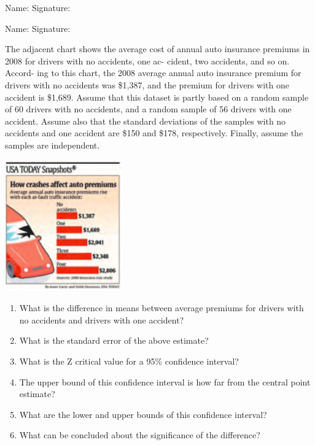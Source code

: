 \documentclass[11pt, chapterprefix=true]{scrbook}\usepackage[]{graphicx}\usepackage[]{color}
\begin{document}
\begin{exercises}
\begin{exercise}
\begin{center}
{{\vspace{4mm}
Name: \underline{\phantom{xxxxxxxxxxxxxxxxxxxxxxxx}} Signature: \underline{\phantom{xxxxxxxxxxxxxxxxxxxxxxxx}}

\vspace{4mm}
Name: \underline{\phantom{xxxxxxxxxxxxxxxxxxxxxxxx}} Signature: \underline{\phantom{xxxxxxxxxxxxxxxxxxxxxxxx}}
 }}
\end{center}

\begin{minipage}[ht]{7cm}

The adjacent chart shows the average cost of annual auto insurance premiums in 2008 for drivers with no accidents, one ac- cident, two accidents, and so on. Accord- ing to this chart, the 2008 average annual auto insurance premium for drivers with no accidents was \$1,387, and the premium for drivers with one accident is \$1,689. Assume that this dataset is partly based on a random sample of 60 drivers with no accidents, and a random sample of 56 drivers with one accident. Assume also that the standard deviations of the samples with no accidents and one accident are \$150 and \$178, respectively. Finally, assume the samples are independent.

\end{minipage} \hfill
\begin{minipage}[ht]{7cm}

\centering
  \includegraphics[width=5cm]{chapters/Workshops/ext_figure/UsaToday.png}
\end{minipage}

\begin{enumerate}
\item  What is the difference in means between average premiums for drivers with no accidents and drivers with one accident?
\item  What is the standard error of the above estimate?
\item  What is the Z critical value for a 95\% confidence interval?
\item  The upper bound of this confidence interval is how far from the central point estimate?
\item  What are the lower and upper bounds of this confidence interval?
\item  What can be concluded about the significance of the difference?
\end{enumerate}


\end{exercise}
\end{exercises}
\end{document}
